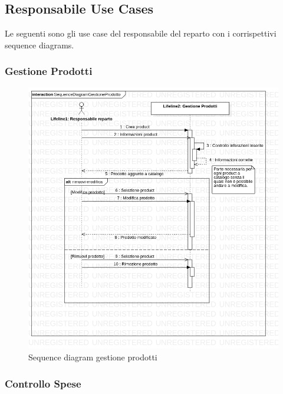 \documentclass[12pt, a4paper]{article}
\numberwithin{equation}{section} %
\begin{document}
\newpage

\subsection{Responsabile Use Cases}

Le seguenti sono gli use case del responsabile del reparto con i corrispettivi 
sequence diagrams.

\subsubsection{Gestione Prodotti}

\begin{figure}[h]
\centering
\includegraphics[width=\textwidth]{Use Case Model!Gestione prodotti!InteractionGestioneProdotti!SequenceDiagramGestioneProdotto_9.png}
\caption{Sequence diagram gestione prodotti}
\end{figure}

\subsubsection{Controllo Spese}
\end{document}

